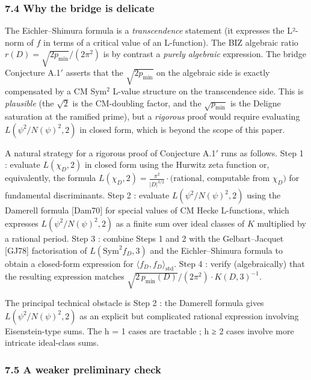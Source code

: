 \documentclass[
  11pt,
  a4paper,
]{amsart}
\begin{document}
\hypertarget{why-the-bridge-is-delicate}{%
\subsubsection{7.4 Why the bridge is delicate}\label{why-the-bridge-is-delicate}}

The Eichler--Shimura formula is a \emph{transcendence} statement (it expresses the L²-norm of \(f\) in terms of a critical value of an L-function). The BIZ algebraic ratio \(r(D) = \sqrt{2 p_{\min}}/(2\pi^{2})\) is by contrast a \emph{purely algebraic} expression. The bridge Conjecture A.1\('\) asserts that the \(\sqrt{2 p_{\min}}\) on the algebraic side is exactly compensated by a CM Sym\(^{2}\) L-value structure on the transcendence side. This is \emph{plausible} (the \(\sqrt 2\) is the CM-doubling factor, and the \(\sqrt{p_{\min}}\) is the Deligne saturation at the ramified prime), but a \emph{rigorous} proof would require evaluating \(L(\psi^{2}/N(\psi)^{2}, 2)\) in closed form, which is beyond the scope of this paper.

A natural strategy for a rigorous proof of Conjecture A.1\('\) runs as follows. Step 1 : evaluate \(L(\chi_D, 2)\) in closed form using the Hurwitz zeta function or, equivalently, the formula \(L(\chi_D, 2) = \frac{\pi^{2}}{|D|^{3/2}}\cdot\text{(rational, computable from } \chi_D\text{)}\) for fundamental discriminants. Step 2 : evaluate \(L(\psi^{2}/N(\psi)^{2}, 2)\) using the Damerell formula {[}Dam70{]} for special values of CM Hecke L-functions, which expresses \(L(\psi^{2}/N(\psi)^{2}, 2)\) as a finite sum over ideal classes of \(K\) multiplied by a rational period. Step 3 : combine Steps 1 and 2 with the Gelbart--Jacquet {[}GJ78{]} factorisation of \(L(\mathrm{Sym}^{2} f_D, 3)\) and the Eichler--Shimura formula to obtain a closed-form expression for \(\langle f_D, f_D\rangle_{\mathrm{std}}\). Step 4 : verify (algebraically) that the resulting expression matches \(\sqrt{2\,p_{\min}(D)}/(2\pi^{2})\cdot K(D, 3)^{-1}\).

The principal technical obstacle is Step 2 : the Damerell formula gives \(L(\psi^{2}/N(\psi)^{2}, 2)\) as an explicit but complicated rational expression involving Eisenstein-type sums. The h = 1 cases are tractable ; h ≥ 2 cases involve more intricate ideal-class sums.

\hypertarget{a-weaker-preliminary-check}{%
\subsubsection{7.5 A weaker preliminary check}\label{a-weaker-preliminary-check}}
\end{document}

